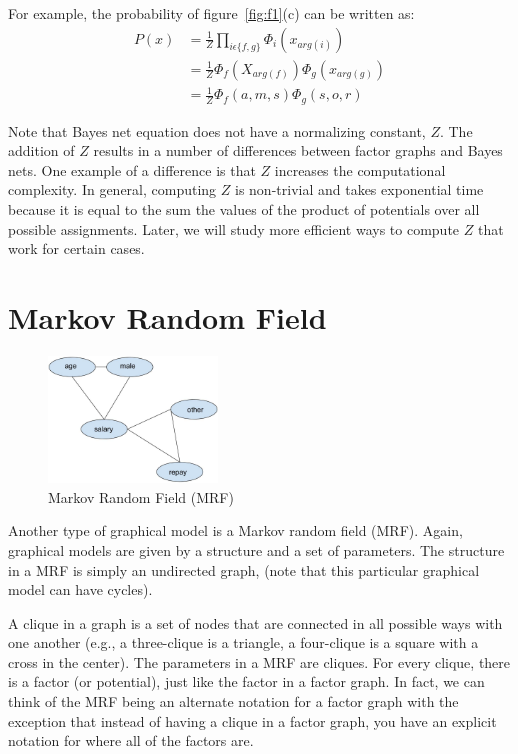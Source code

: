 \documentclass[twoside]{article}
\begin{document}
For example, the probability of figure~\ref{fig:f1}(c) can be written as:
\begin{equation*}
\begin{split}
P(x) & =\frac{1}{Z}\prod_{i\epsilon\{f,g\}}\Phi_i(x_{arg(i)}) \\
& =\frac{1}{Z}\Phi_f(X_{arg(f)})\Phi_g(x_{arg(g)}) \\
& =\frac{1}{Z}\Phi_f(a,m,s)\Phi_g(s,o,r)
\end{split}
\end{equation*}

Note that Bayes net equation does not have a normalizing constant, $Z$.
The addition of $Z$ results in a number of differences between factor graphs and Bayes nets.
One example of a difference is that $Z$ increases the computational complexity.
In general, computing $Z$ is non-trivial and takes exponential time because it is equal to the sum 
the values of the product of potentials over all possible assignments.
Later, we will study more efficient ways to compute $Z$ that work for certain cases.

\section{Markov Random Field}
\begin{figure}[h]
\caption{Markov Random Field (MRF)}
\label{fig:f3}
\centering
\includegraphics[width=0.4\textwidth]{MRF}
\end{figure}

Another type of graphical model is a Markov random field (MRF).
Again, graphical models are given by a structure and a set of parameters.
The structure in a MRF is simply an undirected graph, (note that this particular graphical model can have cycles).

A clique in a graph is a set of nodes that are connected in all possible ways with one another 
(e.g., a three-clique is a triangle, a four-clique is a square with a cross in the center).
The parameters in a MRF are cliques.
For every clique, there is a factor (or potential), just like the factor in a factor graph.
In fact, we can think of the MRF being an alternate notation for a factor graph 
with the exception that
 instead of having a clique in a factor graph, you have an explicit notation for where all of the factors are.
\end{document}
